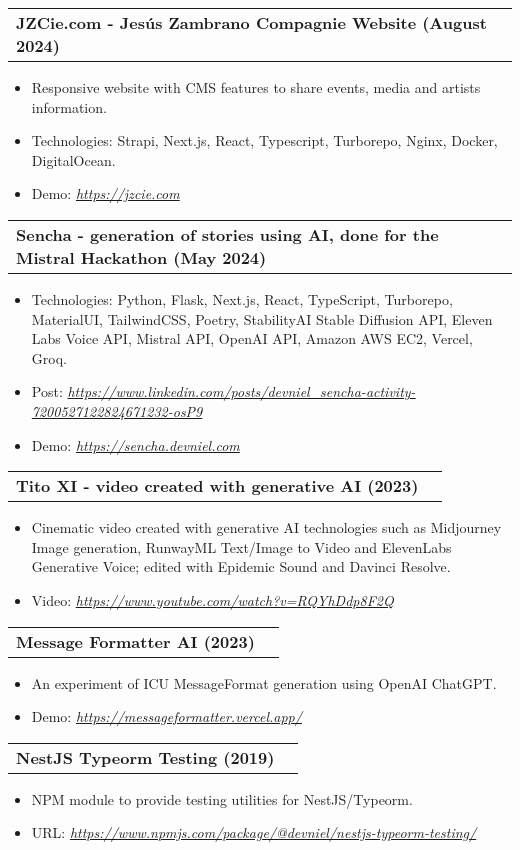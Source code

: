\documentclass[letterpaper,11pt]{article}
\makeatletter
\newcommand{\resumeItem}[1]{
  \item\small{
    {#1 \vspace{-2pt}}
  }
}
\newcommand{\resumeProjectHeading}[2]{
    \vspace{-2pt}\item
    \begin{tabular*}{0.97\textwidth}{l@{\extracolsep{\fill}}r}
      \small#1 & #2 \\
    \end{tabular*}\vspace{-7pt}
}
\newcommand{\resumeItemListStart}{\begin{itemize}}
\newcommand{\resumeItemListEnd}{\end{itemize}\vspace{-5pt}}
\makeatother
\begin{document}
      \resumeProjectHeading
      {\textbf{JZCie.com - Jesús Zambrano Compagnie Website (August 2024)}}{}
        \resumeItemListStart
          \resumeItem{Responsive website with CMS features to share events, media and artists information.}
          \resumeItem{Technologies: Strapi, Next.js, React, Typescript, Turborepo, Nginx, Docker, DigitalOcean.}
          \resumeItem{Demo: \emph{\href{https://jzcie.com}{\color{blue}https://jzcie.com}}}
        \resumeItemListEnd

      \resumeProjectHeading
      {\textbf{Sencha - generation of stories using AI, done for the Mistral Hackathon (May 2024)}}{}
        \resumeItemListStart
          \resumeItem{Technologies: Python, Flask, Next.js, React, TypeScript, Turborepo, MaterialUI, TailwindCSS, Poetry, StabilityAI Stable Diffusion API, Eleven Labs Voice API, Mistral API, OpenAI API, Amazon AWS EC2, Vercel, Groq.}
          \resumeItem{Post: \emph{\href{https://www.linkedin.com/posts/devniel_sencha-activity-7200527122824671232-osP9}{\color{blue}https://www.linkedin.com/posts/devniel\_sencha-activity-7200527122824671232-osP9}}}
          \resumeItem{Demo: \emph{\href{https://sencha.devniel.com}{\color{blue}https://sencha.devniel.com}}}
        \resumeItemListEnd

      \resumeProjectHeading
        {\textbf{Tito XI - video created with generative AI (2023)}}{}
          \resumeItemListStart
            \resumeItem{Cinematic video created with generative AI technologies such as Midjourney Image generation, RunwayML Text/Image to Video and ElevenLabs Generative Voice; edited with Epidemic Sound and Davinci Resolve.}
            \resumeItem{Video: \emph{\href{https://www.youtube.com/watch?v=RQYhDdp8F2Q}{\color{blue}https://www.youtube.com/watch?v=RQYhDdp8F2Q}}}
          \resumeItemListEnd

      \resumeProjectHeading
      {\textbf{Message Formatter AI (2023)}}{}
        \resumeItemListStart
          \resumeItem{An experiment of ICU MessageFormat generation using OpenAI ChatGPT.}
          \resumeItem{Demo: \emph{\href{https://messageformatter.vercel.app/}{\color{blue}https://messageformatter.vercel.app/}}}
        \resumeItemListEnd

      \resumeProjectHeading
      {\textbf{NestJS Typeorm Testing (2019)}}{}
        \resumeItemListStart
          \resumeItem{NPM module to provide testing utilities for NestJS/Typeorm.}
          \resumeItem{URL: \emph{\href{https://www.npmjs.com/package/@devniel/nestjs-typeorm-testing/}{\color{blue}https://www.npmjs.com/package/@devniel/nestjs-typeorm-testing/}}}
        \resumeItemListEnd
\end{document}
